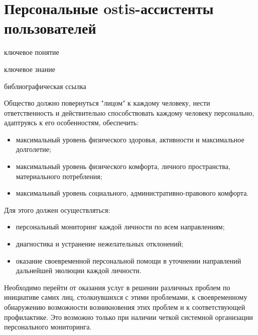 \section{Персональные ostis-ассистенты пользователей}
{\label{sec_ostis_assistant}} 

\begin{SCn}

\bigskip

\begin{scnrelfromlist}{ключевое понятие}
\end{scnrelfromlist}

\bigskip

\begin{scnrelfromlist}{ключевое знание}
\end{scnrelfromlist}

\bigskip

\begin{scnrelfromlist}{библиографическая ссылка}
\end{scnrelfromlist}

\end{SCn}

Общество должно повернуться "лицом"{} к каждому человеку, нести ответственность и действительно способствовать каждому человеку персонально, адаптруясь к его особенностям, обеспечить:
\begin{itemize}
    \item максимальный уровень физического здоровья, активности и максимальное долголетие;
    \item максимальный уровень физического комфорта, личного пространства, материального потребления;
    \item максимальный уровень социального, административно-правового комфорта.
\end{itemize}

Для этого должен осуществляться:
\begin{itemize}
    \item персональный мониторинг каждой личности по всем направлениям;
    \item диагностика и устранение нежелательных отклонений;
    \item оказание своевременной персональной помощи в уточнении направлений дальнейшей эволюции каждой личности.
\end{itemize}

Необходимо перейти от оказания услуг в решении различных проблем по инициативе самих лиц, столкнувшихся с этими проблемами, к своевременному обнаружению возможности возникновения этих проблем и к соответствующей профилактике. 
Это возможно только при наличии четкой системной организации персонального мониторинга. 

